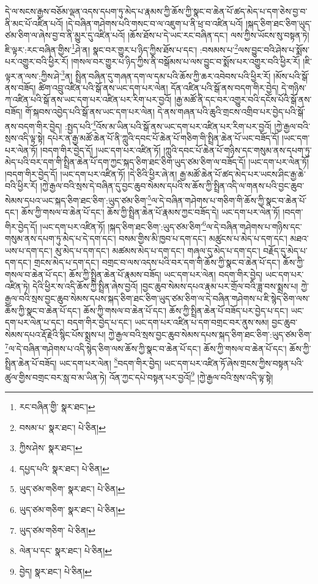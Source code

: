 དེ་ལ་སངས་རྒྱས་བཅོམ་ལྡན་འདས་དཔག་ཏུ་མེད་པ་རྣམས་ཀྱི་ཆོས་ཀྱི་སྣང་བ་ཆེན་པོ་ཚད་མེད་པ་དག་ཅེས་བྱ་བ་ནི་མང་པོ་འཛིན་པའོ། །དེ་བཞིན་གཤེགས་པའི་གསང་བ་ལ་འཇུག་པ་ནི་ཕྲ་བ་འཛིན་པའོ། །སྐད་ཅིག་ཐང་ཅིག་ཡུད་ཙམ་ཅིག་ལ་ཞེས་བྱ་བ་ནི་མྱུར་དུ་འཛིན་པའོ། །ཆོས་ཐོས་པ་དེ་ཡང་རང་བཞིན་དང་། ལས་ཀྱིས་ཡོངས་སུ་བསྟན་ཏེ། ཇི་ལྟར་:རང་བཞིན་གྱིས་\footnote{རང་བཞིན་གྱི་  སྣར་ཐང་། }ཤེ་ན། སྣང་བར་གྱུར་པ་ཉིད་ཀྱིས་ཐོས་པ་དང་། :བསམས་པ་\footnote{བསམ་པ་  སྣར་ཐང་།  པེ་ཅིན། }ལས་བྱུང་བའི་ཤེས་པ་སྨོས་པར་འགྱུར་བའི་ཕྱིར་རོ། །གསལ་བར་གྱུར་པ་ཉིད་ཀྱིས་ནི་བསྒོམས་པ་ལས་བྱུང་བ་སྨོས་པར་འགྱུར་བའི་ཕྱིར་རོ། །ཇི་ལྟར་ན་ལས་:ཀྱིས་ཤེ་\footnote{ཀྱིས་ཤེས་  སྣར་ཐང་། }ན། སྤྲིན་བཞིན་དུ་གཞན་དག་ལ་དམ་པའི་ཆོས་ཀྱི་ཆར་འབེབས་པའི་ཕྱིར་རོ། །མོས་པའི་སྒོ་ནས་བཟོད། ཚིག་འབྲུ་འཛིན་པའི་སྒོ་ནས་ཡང་དག་པར་ལེན། དོན་འཛིན་པའི་སྒོ་ནས་བདག་གིར་བྱེད། དེ་གཉིས་ཀ་འཛིན་པའི་སྒོ་ནས་ཡང་དག་པར་འཛིན་པར་རིག་པར་བྱའོ། །རྒྱ་མཚོ་ནི་དང་བར་འགྱུར་བའི་དངོས་པོའི་སྒོ་ནས་བཟོད། གོ་སྐབས་འབྱེད་པའི་སྒོ་ནས་ཡང་དག་པར་ལེན། དེ་ནས་གཞན་པའི་ཆུའི་གྲངས་འགྲིབ་པར་བྱེད་པའི་སྒོ་ནས་བདག་གིར་བྱེད། :སྤྱད་པའི་\footnote{དཔྱད་པའི་  སྣར་ཐང་།  པེ་ཅིན། }འོས་མ་ཡིན་པའི་སྒོ་ནས་ཡང་དག་པར་འཛིན་པར་རིག་པར་བྱའོ། །ཀྱེ་རྒྱལ་བའི་སྲས་འདི་ལྟ་སྟེ། དཔེར་ན་རྒྱ་མཚོ་ཆེན་པོ་ནི་ཀླུའི་དབང་པོ་ཆེན་པོ་གཅིག་གི་སྤྲིན་ཆེན་པོ་ཡང་བཟོད་དོ། །ཡང་དག་པར་ལེན་ཏོ། །བདག་གིར་བྱེད་དོ། །ཡང་དག་པར་འཛིན་ཏོ། །ཀླུའི་དབང་པོ་ཆེན་པོ་གཉིས་དང་གསུམ་ནས་དཔག་ཏུ་མེད་པའི་བར་དག་གི་སྤྲིན་ཆེན་པོ་དག་ཀྱང་སྐད་ཅིག་ཐང་ཅིག་ཡུད་ཙམ་ཅིག་ལ་བཟོད་དོ། །ཡང་དག་པར་ལེན་ཏོ། །བདག་གིར་བྱེད་དོ། །ཡང་དག་པར་འཛིན་ཏོ། །དེ་ཅིའི་ཕྱིར་ཞེ་ན། རྒྱ་མཚོ་ཆེན་པོ་ཚད་མེད་པར་ཡངས་ཤིང་རྒྱ་ཆེ་བའི་ཕྱིར་རོ། །ཀྱེ་རྒྱལ་བའི་སྲས་དེ་བཞིན་དུ་བྱང་ཆུབ་སེམས་དཔའི་ས་ཆོས་ཀྱི་སྤྲིན་འདི་ལ་གནས་པའི་བྱང་ཆུབ་སེམས་དཔའ་ཡང་སྐད་ཅིག་ཐང་ཅིག་:ཡུད་ཙམ་ཅིག་\footnote{ཡུད་ཙམ་གཅིག་  སྣར་ཐང་།  པེ་ཅིན། }ལ་དེ་བཞིན་གཤེགས་པ་གཅིག་གི་ཆོས་ཀྱི་སྣང་བ་ཆེན་པོ་དང་། ཆོས་ཀྱི་གསལ་བ་ཆེན་པོ་དང་། ཆོས་ཀྱི་སྤྲིན་ཆེན་པོ་རྣམས་ཀྱང་བཟོད་དེ། ཡང་དག་པར་ལེན་ཏོ། །བདག་གིར་བྱེད་དོ། །ཡང་དག་པར་འཛིན་ཏོ། །སྐད་ཅིག་ཐང་ཅིག་:ཡུད་ཙམ་ཅིག་\footnote{ཡུད་ཙམ་གཅིག་  སྣར་ཐང་།  པེ་ཅིན། }ལ་དེ་བཞིན་གཤེགས་པ་གཉིས་དང་གསུམ་ནས་དཔག་ཏུ་མེད་པ་དེ་དག་དང་། བསམ་གྱིས་མི་ཁྱབ་པ་དག་དང་། མཚུངས་པ་མེད་པ་དག་དང་། མཐའ་ཡས་པ་དག་དང་། མུ་མེད་པ་དག་དང་། མཚམས་མེད་པ་དག་དང་། གཞལ་དུ་མེད་པ་དག་དང་། བརྗོད་དུ་མེད་པ་དག་དང་། གྲངས་མེད་པ་དག་དང་། བགྲང་བ་ལས་འདས་པའི་བར་དག་གི་ཆོས་ཀྱི་སྣང་བ་ཆེན་པོ་དང་། ཆོས་ཀྱི་གསལ་བ་ཆེན་པོ་དང་། ཆོས་ཀྱི་སྤྲིན་ཆེན་པོ་རྣམས་བཟོད། ཡང་དག་པར་ལེན། བདག་གིར་བྱེད། ཡང་དག་པར་འཛིན་ཏེ། དེའི་ཕྱིར་ས་འདི་ཆོས་ཀྱི་སྤྲིན་ཞེས་བྱའོ། །བྱང་ཆུབ་སེམས་དཔའ་རྣམ་པར་གྲོལ་བའི་ཟླ་བས་སྨྲས་པ། ཀྱེ་རྒྱལ་བའི་སྲས་བྱང་ཆུབ་སེམས་དཔས་སྐད་ཅིག་ཐང་ཅིག་ཡུད་ཙམ་ཅིག་ལ་དེ་བཞིན་གཤེགས་པ་ཇི་སྙེད་ཅིག་ལས་ཆོས་ཀྱི་སྣང་བ་ཆེན་པོ་དང་། ཆོས་ཀྱི་གསལ་བ་ཆེན་པོ་དང་། ཆོས་ཀྱི་སྤྲིན་ཆེན་པོ་བཟོད་པར་བྱེད་པ་དང་། ཡང་དག་པར་ལེན་པ་དང་། བདག་གིར་བྱེད་པ་དང་། ཡང་དག་པར་འཛིན་པ་དག་བགྲང་བར་ནུས་སམ། བྱང་ཆུབ་སེམས་དཔའ་རྡོ་རྗེའི་སྙིང་པོས་སྨྲས་པ། ཀྱེ་རྒྱལ་བའི་སྲས་བྱང་ཆུབ་སེམས་དཔས་སྐད་ཅིག་ཐང་ཅིག་:ཡུད་ཙམ་ཅིག་\footnote{ཡུད་ཙམ་གཅིག་  པེ་ཅིན། }ལ་དེ་བཞིན་གཤེགས་པ་འདི་སྙེད་ཅིག་ལས་ཆོས་ཀྱི་སྣང་བ་ཆེན་པོ་དང་། ཆོས་ཀྱི་གསལ་བ་ཆེན་པོ་དང་། ཆོས་ཀྱི་སྤྲིན་ཆེན་པོ་བཟོད། ཡང་དག་པར་ལེན། \footnote{ལེན་པ་དང་  སྣར་ཐང་།  པེ་ཅིན། }བདག་གིར་བྱེད། ཡང་དག་པར་འཛིན་ཏོ་ཞེས་གྲངས་ཀྱིས་བསྟན་པའི་ཚུལ་གྱིས་བགྲང་བར་སླ་བ་མ་ཡིན་ཏེ། འོན་ཀྱང་དཔེ་བསྟན་པར་བྱའོ།\footnote{བྱེད།  སྣར་ཐང་།  པེ་ཅིན། } །ཀྱེ་རྒྱལ་བའི་སྲས་འདི་ལྟ་སྟེ། 